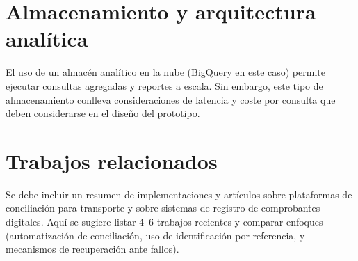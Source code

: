 \section{Almacenamiento y arquitectura analítica}
El uso de un almacén analítico en la nube (BigQuery en este caso) permite ejecutar consultas agregadas y reportes a escala. Sin embargo, este tipo de almacenamiento conlleva consideraciones de latencia y coste por consulta que deben considerarse en el diseño del prototipo.

\section{Trabajos relacionados}
Se debe incluir un resumen de implementaciones y artículos sobre plataformas de conciliación para transporte y sobre sistemas de registro de comprobantes digitales. Aquí se sugiere listar 4–6 trabajos recientes y comparar enfoques (automatización de conciliación, uso de identificación por referencia, y mecanismos de recuperación ante fallos).

